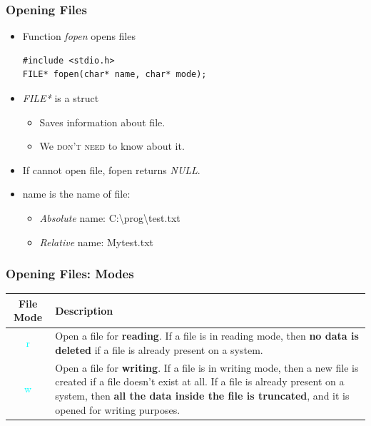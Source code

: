 \documentclass{../c-lecture}
\begin{document}
\begin{frame}[fragile]
  \frametitle{Opening Files}
  \begin{itemize}
    \item Function \textit{\color{Violet} fopen} opens files
    \begin{verbatim}
#include <stdio.h>
FILE* fopen(char* name, char* mode);
    \end{verbatim}
    \item \textit{\color{YellowOrange} FILE*} is a struct
    \begin{itemize}
      \item Saves information about file.
      \item We \textsc{\color{RubineRed} don’t need} to know about it.
    \end{itemize}
    \item
      If cannot open file, fopen returns \textit{\color{YellowOrange} NULL}.
    \item name is the name of file:
    \begin{itemize}
      \item \textit{\color{Cyan} Absolute} name: C:\textbackslash prog\textbackslash test.txt
      \item \textit{\color{Cyan} Relative} name: Mytest.txt
    \end{itemize}
  \end{itemize}
\end{frame}

\begin{frame}
  \frametitle{Opening Files: Modes}
  \begin{table}
  \begin{tabularx}{\textwidth}{cX}
    \toprule
    File Mode &
    Description \\
    \midrule
    \textcolor{Cyan}{r} &
    Open a file for \textbf{\color{YellowOrange} reading}. If a file is
    in reading mode, then
    \textbf{\color{LimeGreen} no data is deleted} if a file is
    already present on a system.\\
    \midrule
    \textcolor{Cyan}{w} &
    Open a file for \textbf{\color{YellowOrange} writing}. If a file is
    in writing mode, then a new file is created if a file doesn't exist
    at all. If a file is already present on a system, then
    \textbf{\color{LimeGreen} all the data inside the file is truncated},
    and it is opened for writing purposes.\\
    \bottomrule
  \end{tabularx}
  \end{table}
\end{frame}
\end{document}
